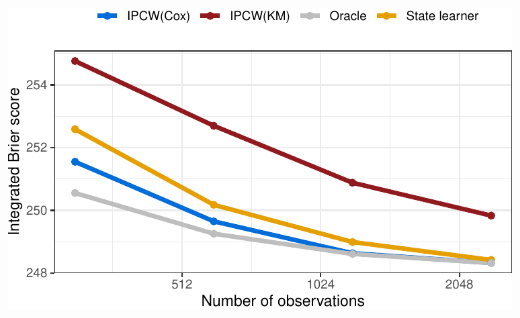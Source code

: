 \documentclass[a0,portrait]{a0poster}
\newcommand{\1}{\mathds{1}}
\begin{document}
\begin{minipage}{\textwidth}
\begin{minipage}[t]{1\linewidth}
\begin{multicols}{2}
\begin{multicols}{2}
  \vfill\null \columnbreak
  
  \begin{center}
  \includegraphics[width=1\linewidth]{experiment-fig-sl-ipcw.pdf} 
\end{center}

\end{multicols}

\vspace{-1em}

\setlength{\columnseprule}{0pt}
\setlength{\columnsep}{30pt}
\begin{multicols}{2}
  

\end{multicols}
\end{multicols}
\end{minipage}
\end{minipage}
\end{document}
